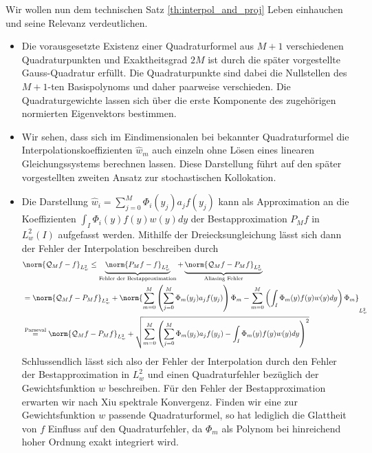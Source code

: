\begin{mathbem}
Wir wollen nun dem technischen Satz \ref{th:interpol_and_proj} Leben einhauchen und seine Relevanz verdeutlichen.
\begin{itemize}
\item
Die vorausgesetzte Existenz einer Quadraturformel aus $M+1$ verschiedenen Quadraturpunkten und Exaktheitsgrad $2M$ ist durch die später vorgestellte Gauss-Quadratur erfüllt. Die Quadraturpunkte sind dabei die Nullstellen des $M+1$-ten Basispolynoms und daher paarweise verschieden. Die Quadraturgewichte lassen sich über die erste Komponente des zugehörigen normierten Eigenvektors bestimmen.
\item
Wir sehen, dass sich im Eindimensionalen bei bekannter Quadraturformel die Interpolationskoeffizienten $\hat{w}_m$ auch einzeln ohne Lösen eines linearen Gleichungssystems berechnen lassen. Diese Darstellung führt auf den später vorgestellten zweiten Ansatz zur stochastischen Kollokation.
\item
Die Darstellung $\hat{w}_i=\sum_{j=0}^M\Phi_i(y_j)a_jf(y_j)$ kann als Approximation an die Koeffizienten $\int_I \Phi_i(y)f(y)w(y)dy$ der Bestapproximation $P_Mf$ in $L_w^2(I)$ aufgefasst werden. Mithilfe der Dreiecksungleichung lässt sich dann der Fehler der Interpolation beschreiben durch
\begin{align*}
&\norm{\mathcal{Q}_Mf-f}_{L_w^2}\le \underbrace{\norm{P_Mf-f}_{L_w^2}}_{\text{Fehler der Bestapproximation}}+\underbrace{\norm{\mathcal{Q}_Mf-P_Mf}_{L_w^2}}_{\text{Aliasing Fehler}}\\
&=\norm{\mathcal{Q}_Mf-P_Mf}_{L_w^2}+\norm{\sum_{m=0}^M\left(\sum_{j=0}^M\Phi_m(y_j)a_jf(y_j)\right)\Phi_m-\sum_{m=0}^M\left(\int_I\Phi_m(y)f(y)w(y)dy\right)\Phi_m}_{L_w^2}\\
&\stackrel{\text{Parseval}}{=}\norm{\mathcal{Q}_Mf-P_Mf}_{L_w^2}+\sqrt{\sum_{m=0}^M\left(\sum_{j=0}^M\Phi_m(y_j)a_jf(y_j)-\int_I\Phi_m(y)f(y)w(y)dy\right)^2}
\end{align*}
Schlussendlich lässt sich also der Fehler der Interpolation durch den Fehler der Bestapproximation in $L_w^2$ und einen Quadraturfehler bezüglich der Gewichtsfunktion $w$ beschreiben. Für den Fehler der Bestapproximation erwarten wir nach Xiu spektrale Konvergenz. Finden wir eine zur Gewichtsfunktion $w$ passende Quadraturformel, so hat lediglich die Glattheit von $f$ Einfluss auf den Quadraturfehler, da $\Phi_m$ als Polynom bei hinreichend hoher Ordnung exakt integriert wird.
\end{itemize}
\end{mathbem}
